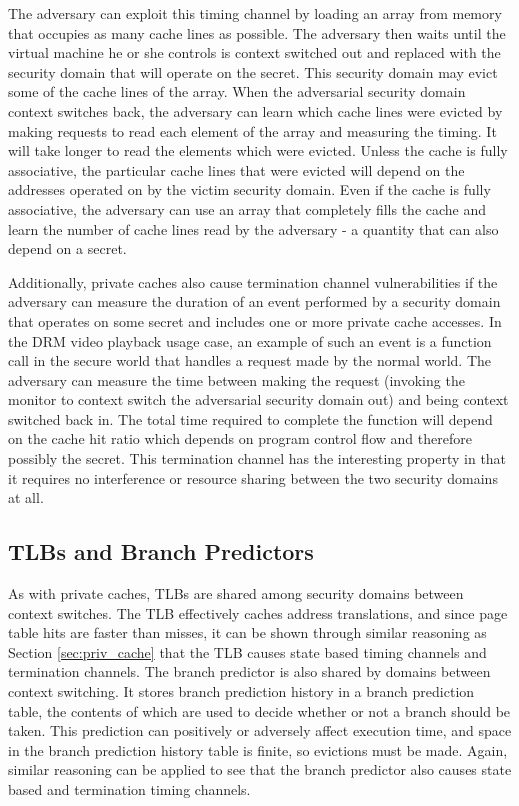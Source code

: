 The adversary can exploit this timing channel by loading an array from memory 
that occupies as many cache lines as possible. The adversary then waits until 
the virtual machine he or she controls is context switched out and replaced 
with the security domain that will operate on the secret. This security domain 
may evict some of the cache lines of the array. When the adversarial security 
domain context switches back, the adversary can learn which cache lines were 
evicted by making requests to read each element of the array and measuring the 
timing. It will take longer to read the elements which were evicted. Unless the 
cache is fully associative, the particular cache lines that were evicted will 
depend on the addresses operated on by the victim security domain. Even if the 
cache is fully associative, the adversary can use an array that completely 
fills the cache and learn the number of cache lines read by the adversary - a 
quantity that can also depend on a secret.

Additionally, private caches also cause termination channel vulnerabilities if 
the adversary can measure the duration of an event performed by a security 
domain that operates on some secret and includes one or more private cache
accesses. In the DRM video playback usage case, an example of such an event is 
a function call in the secure world that handles a request made by the normal 
world. The adversary can measure the time between making the request (invoking
the monitor to context switch the adversarial security domain out) and being 
context switched back in. The total time required to complete the function will 
depend on the cache hit ratio which depends on program control flow and 
therefore possibly the secret. This termination channel has the interesting 
property in that it requires no interference or resource sharing between the 
two security domains at all.
 
\subsection{TLBs and Branch Predictors}
As with private caches, TLBs are shared among security domains between context 
switches. The TLB effectively caches address translations, and since page table 
hits are faster than misses, it can be shown through similar reasoning as 
Section \ref{sec:priv_cache} that the TLB causes state based timing channels 
and termination channels. The branch predictor is also shared by domains 
between context switching. It stores branch prediction history in a branch 
prediction table, the contents of which are used to decide whether or not a 
branch should be taken. This prediction can positively or adversely affect 
execution time, and space in the branch prediction history table is finite, so 
evictions must be made. Again, similar reasoning can be applied to see that the 
branch predictor also causes state based and termination timing channels.

